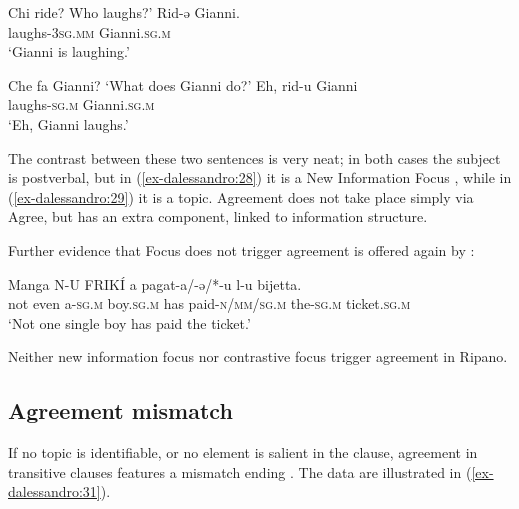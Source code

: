 \documentclass[output=paper
,modfonts
,nonflat]{langsci/langscibook}
\begin{document}
\begin{exe} \settowidth{}
	\ex \label{ex-dalessandro:28}\citet[9]{Paciaroni2017} \xlist
	\ex Chi ride?
	\glt Who laughs?'
	\ex
	\gll Rid-ə     Gianni. \\
	laughs-\textsc{3sg.mm} Gianni.\textsc{sg.m}\\ 
	\glt `Gianni is laughing.'
	\endxlist
\end{exe}
\begin{exe} \settowidth{}
	\ex \label{ex-dalessandro:29}\citet[9]{Paciaroni2017} \xlist
	\ex Che fa Gianni?
	\glt`What does Gianni do?'
	\ex
	\gll Eh,   rid-u     Gianni \\
	{} laughs-\textsc{sg.m} Gianni.\textsc{sg.m}\\ 
	\glt `Eh, Gianni laughs.'
	\endxlist
\end{exe}
The contrast between these two sentences is very neat; in both cases the subject is postverbal, but in (\ref{ex-dalessandro:28}) it is a New Information Focus \citep{Lambrecht1981,Cruschina2012,Frascarelli2007}, while in (\ref{ex-dalessandro:29}) it is a topic. Agreement does not take place simply via Agree, but has an extra component, linked to information structure.

Further evidence that Focus does not trigger agreement is offered again by \citet{Paciaroni2017}:

\begin{exe}
\ex
\gll Manga   N-U   FRIKÍ   a pagat-a/-ǝ/*-u  l-u    bijetta. \\
{not even}   a-\textsc{sg.m} boy.\textsc{sg.m} has paid-\textsc{n/mm/sg.m} the-\textsc{sg.m} ticket.\textsc{sg.m}\\
\glt `Not one single boy has paid the ticket.'
\end{exe}
Neither new information focus nor contrastive focus trigger agreement in Ripano.
\subsection{Agreement mismatch}\label{sec-dalessandro:4.4}
If no topic is identifiable, or no element is salient in the clause, agreement in transitive clauses features a mismatch ending \citep{D`Alessandro2017}. The data are illustrated in (\ref{ex-dalessandro:31}).
\end{document}
